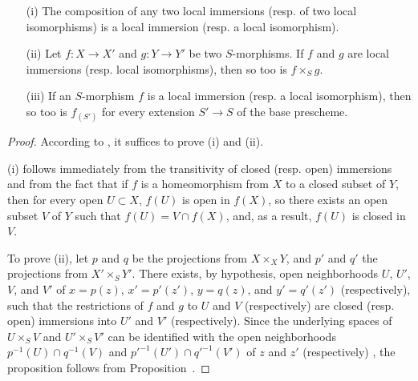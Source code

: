 \begin{proposition}[4.5.5]
\label{I.4.5.5}
\medskip\noindent
\begin{enumerate}
  \item[{\rm(i)}] The composition of any two local immersions (resp. of two local isomorphisms) is a local immersion (resp. a local isomorphism).
  \item[{\rm(ii)}] Let $f:X\to X'$ and $g:Y\to Y'$ be two $S$-morphisms.
    If $f$ and $g$ are local immersions (resp. local isomorphisms), then so too is $f\times_S g$.
  \item[{\rm(iii)}] If an $S$-morphism $f$ is a local immersion (resp. a local isomorphism), then so too is $f_{(S')}$ for every extension $S'\to S$ of the base prescheme.
\end{enumerate}
\end{proposition}

\begin{proof}
\label{proof-I.4.5.5}
According to , it suffices to prove (i) and (ii).

(i) follows immediately from the transitivity of closed (resp. open) immersions  and from the fact that if $f$ is a homeomorphism from $X$ to a closed subset of $Y$, then for every open $U\subset X$, $f(U)$ is open in $f(X)$, so there exists an open subset $V$ of $Y$ such that $f(U)=V\cap f(X)$, and, as a result, $f(U)$ is closed in $V$.

To prove (ii), let $p$ and $q$ be the projections from $X\times_X Y$, and $p'$ and $q'$ the projections from $X'\times_S Y'$.
There exists, by hypothesis, open neighborhoods $U$, $U'$, $V$, and $V'$ of $x=p(z)$, $x'=p'(z')$, $y=q(z)$, and $y'=q'(z')$ (respectively), such that the restrictions of $f$ and $g$ to $U$ and $V$ (respectively) are closed (resp. open) immersions into $U'$ and $V'$ (respectively).
Since the underlying spaces of $U\times_S V$ and $U'\times_S V'$ can be identified with the open neighborhoods $p^{-1}(U)\cap q^{-1}(V)$ and ${p'}^{-1}(U')\cap{q'}^{-1}(V')$ of $z$ and $z'$ (respectively) , the proposition follows from Proposition~.
\end{proof}

